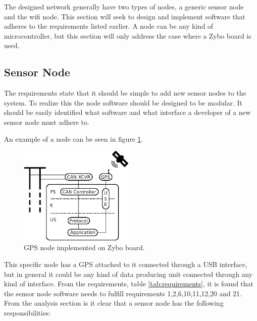 The designed network generally have two types of nodes, a generic sensor node and the wifi node.
This section will seek to design and implement software that adheres to the requirements listed earlier.
A node can be any kind of microcontroller, but this section will only address the case where a Zybo board is used. 

\subsection{Sensor Node}
\label{sec:sensor_node}
The requirements state that it should be simple to add new sensor nodes to the system. 
To realize this the node software should be designed to be modular.
It should be easily identified what software and what interface a developer of a new sensor node must adhere to.

An example of a node can be seen in figure \ref{fig:gps_node}.



\begin{figure}[!h]
\centering
\includegraphics[width=0.5\textwidth]{graphics/analysis_gps.eps}
\caption{GPS node implemented on Zybo board.}
\label{fig:gps_node}
\end{figure}

This specific node has a GPS attached to it connected through a USB interface, but in general it could be any kind of data producing unit connected through any kind of interface.
From the requirements, table \ref{tab:requirements}, it is found that the sensor node software needs to fulfill requirements 1,2,6,10,11,12,20 and 21.
From the analysis section is it clear that a sensor node has the following responsibilities:

